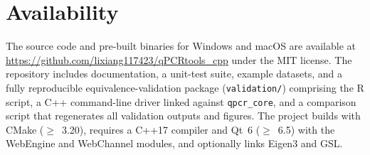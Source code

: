 \section{Availability}

The source code and pre-built binaries for Windows and macOS are available
at \url{https://github.com/lixiang117423/qPCRtools_cpp} under the MIT
license. The repository includes documentation, a unit-test suite, example
datasets, and a fully reproducible equivalence-validation package
(\texttt{validation/}) comprising the R script, a C++ command-line driver
linked against \texttt{qpcr\_core}, and a comparison script that regenerates
all validation outputs and figures. The project builds with CMake
($\geq$~3.20), requires a C++17 compiler and Qt~6 ($\geq$~6.5) with the
WebEngine and WebChannel modules, and optionally links Eigen3 and GSL.
